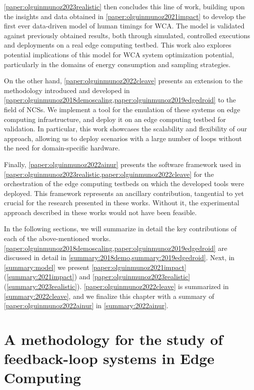 \cref{paper:olguinmunoz2023realistic} then concludes this line of work, building upon the insights and data obtained in \cref{paper:olguinmunoz2021impact} to develop the first ever data-driven model of human timings for \ac{WCA}.
The model is validated against previously obtained results, both through simulated, controlled executions and deployments on a real edge computing testbed.
This work also explores potential implications of this model for \ac{WCA} system optimization potential, particularly in the domains of energy consumption and sampling strategies.

On the other hand, \cref{paper:olguinmunoz2022cleave} presents an extension to the methodology introduced and developed in \cref{paper:olguinmunoz2018demoscaling,paper:olguinmunoz2019edgedroid} to the field of \aclp{NCS}.
We implement a tool for the emulation of these systems on edge computing infrastructure, and deploy it on an edge computing testbed for validation.
In particular, this work showcases the scalability and flexibility of our approach, allowing us to deploy scenarios with a large number of loops without the need for domain-specific hardware.

Finally, \cref{paper:olguinmunoz2022ainur} presents the software framework used in \cref{paper:olguinmunoz2023realistic,paper:olguinmunoz2022cleave} for the orchestration of the edge computing testbeds on which the developed tools were deployed.
This framework represents an ancillary contribution, tangential to yet crucial for the research presented in these works.
Without it, the experimental approach described in these works would not have been feasible.

In the following sections, we will summarize in detail the key contributions of each of the above-mentioned works.
\cref{paper:olguinmunoz2018demoscaling,paper:olguinmunoz2019edgedroid} are discussed in detail in \cref{summary:2018demo,summary:2019edgedroid}.
Next, in \cref{summary:model} we present \cref{paper:olguinmunoz2021impact} (\cref{summary:2021impact}) and \cref{paper:olguinmunoz2023realistic} (\cref{summary:2023realistic}).
\cref{paper:olguinmunoz2022cleave} is summarized in \cref{summary:2022cleave}, and we finalize this chapter with a summary of \cref{paper:olguinmunoz2022ainur} in \cref{summary:2022ainur}.


\section{A methodology for the study of feedback-loop systems in Edge Computing}\label{summary:methodology}

